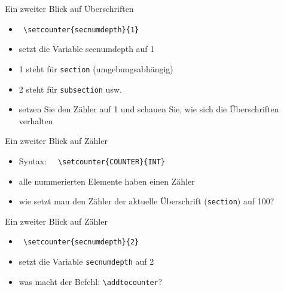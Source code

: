 \begin{frame}[fragile]{Ein zweiter Blick auf Überschriften}
    \begin{itemize}[<+->]
        \item \lstinline| \setcounter{secnumdepth}{1}|
        \item setzt die Variable secnumdepth auf 1
        \item 1 steht für \texttt{section} (umgebungsabhängig)
        \item 2 steht für \texttt{subsection} usw.
        \item setzen Sie den Zähler auf 1 und schauen Sie, wie sich die Überschriften verhalten
    \end{itemize}
\end{frame}


\begin{frame}[fragile]{Ein zweiter Blick auf Zähler}
    \begin{itemize}[<+->]
        \item Syntax: \lstinline|  \setcounter{COUNTER}{INT}|
        \item alle nummerierten Elemente haben einen Zähler
        \item wie setzt man den Zähler der aktuelle Überschrift (\texttt{section}) auf 100?
    \end{itemize}
\end{frame}


\begin{frame}[fragile]{Ein zweiter Blick auf Zähler}
    \begin{itemize}[<+->]
        \item \lstinline| \setcounter{secnumdepth}{2}|
        \item setzt die Variable \texttt{secnumdepth} auf 2
        \item was macht der Befehl: \lstinline|\addtocounter|?
    \end{itemize}
\end{frame}

